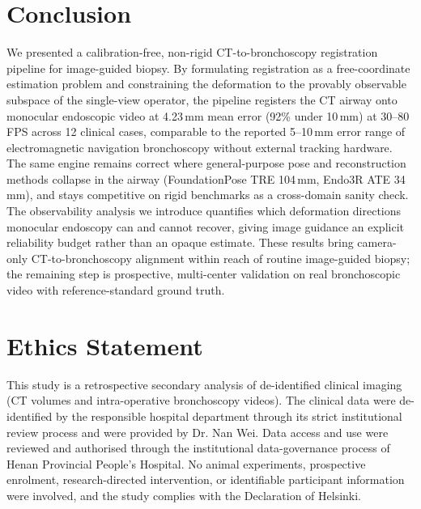 \documentclass[9pt,twoside,web]{ieeecolor2}
\begin{document}
\section{Conclusion}\label{sec:conclusion}
We presented a calibration-free, non-rigid CT-to-bronchoscopy registration pipeline for image-guided biopsy. By formulating registration as a free-coordinate estimation problem and constraining the deformation to the provably observable subspace of the single-view operator, the pipeline registers the CT airway onto monocular endoscopic video at 4.23\,mm mean error (92\% under 10\,mm) at 30--80\,FPS across 12 clinical cases, comparable to the reported 5--10\,mm error range of electromagnetic navigation bronchoscopy without external tracking hardware. The same engine remains correct where general-purpose pose and reconstruction methods collapse in the airway (FoundationPose TRE 104\,mm, Endo3R ATE 34\,mm), and stays competitive on rigid benchmarks as a cross-domain sanity check. The observability analysis we introduce quantifies which deformation directions monocular endoscopy can and cannot recover, giving image guidance an explicit reliability budget rather than an opaque estimate. These results bring camera-only CT-to-bronchoscopy alignment within reach of routine image-guided biopsy; the remaining step is prospective, multi-center validation on real bronchoscopic video with reference-standard ground truth.

\section*{Ethics Statement}
This study is a retrospective secondary analysis of de-identified clinical imaging (CT volumes and intra-operative bronchoscopy videos). The clinical data were de-identified by the responsible hospital department through its strict institutional review process and were provided by Dr. Nan Wei. Data access and use were reviewed and authorised through the institutional data-governance process of Henan Provincial People's Hospital. No animal experiments, prospective enrolment, research-directed intervention, or identifiable participant information were involved, and the study complies with the Declaration of Helsinki.
\end{document}
